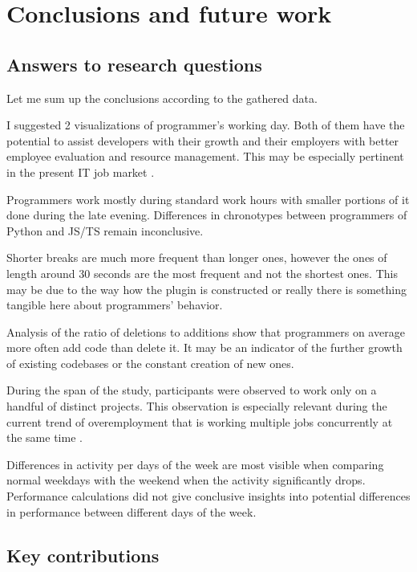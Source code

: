 \chapter{Conclusions and future work}\label{ch:conclusions}

\section{Answers to research questions}
Let me sum up the conclusions according to the gathered data.

I suggested 2 visualizations of programmer's working day. Both of them have the potential to assist developers with their growth and their employers with better employee evaluation and resource management. This may be especially pertinent in the present IT job market \cite{BBC22EMTwitter}.

Programmers work mostly during standard work hours with smaller portions of it done during the late evening. Differences in chronotypes between programmers of Python and JS/TS remain inconclusive.

Shorter breaks are much more frequent than longer ones, however the ones of length around 30 seconds are the most frequent and not the shortest ones. This may be due to the way how the plugin is constructed or really there is something tangible here about programmers' behavior.

Analysis of the ratio of deletions to additions show that programmers on average more often add code than delete it. It may be an indicator of the further growth of existing codebases or the constant creation of new ones.

During the span of the study, participants were observed to work only on a handful of distinct projects. This observation is especially relevant during the current trend of overemployment \cite{Luf21BBCOveremployment} that is working multiple jobs concurrently at the same time \cite{Hie22Overemployment}.

Differences in activity per days of the week are most visible when comparing normal weekdays with the weekend when the activity significantly drops. Performance calculations did not give conclusive insights into potential differences in performance between different days of the week.

\section{Key contributions}

